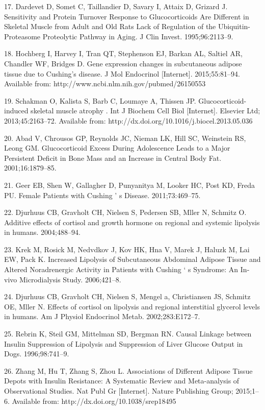 \documentclass[11pt]{article} %
\begin{document}
17. Dardevet D, Somet C, Taillandier D, Savary I, Attaix D, Grizard J.
Sensitivity and Protein Turnover Response to Glucocorticoids Are
Different in Skeletal Muscle from Adult and Old Rats Lack of Regulation
of the Ubiquitin-Proteasome Proteolytic Pathway in Aging. J Clin Invest.
1995;96:2113--9.

18. Hochberg I, Harvey I, Tran QT, Stephenson EJ, Barkan AL, Saltiel AR,
Chandler WF, Bridges D. Gene expression changes in subcutaneous adipose
tissue due to Cushing's disease. J Mol Endocrinol {[}Internet{]}.
2015;55:81--94. Available from:
http://www.ncbi.nlm.nih.gov/pubmed/26150553

19. Schakman O, Kalista S, Barb C, Loumaye A, Thissen JP.
Glucocorticoid-induced skeletal muscle atrophy . Int J Biochem Cell
Biol {[}Internet{]}. Elsevier Ltd; 2013;45:2163--72. Available from:
http://dx.doi.org/10.1016/j.biocel.2013.05.036

20. Abad V, Chrousos GP, Reynolds JC, Nieman LK, Hill SC, Weinstein RS,
Leong GM. Glucocorticoid Excess During Adolescence Leads to a Major
Persistent Deficit in Bone Mass and an Increase in Central Body Fat.
2001;16:1879--85.

21. Geer EB, Shen W, Gallagher D, Punyanitya M, Looker HC, Post KD,
Freda PU. Female Patients with Cushing ' s Disease. 2011;73:469--75.

22. Djurhuus CB, Gravholt CH, Nielsen S, Pedersen SB, Mller N, Schmitz
O. Additive effects of cortisol and growth hormone on regional and
systemic lipolysis in humans. 2004;488--94.

23. Krek M, Rosick M, Nedvdkov J, Kov HK, Hna V, Marek J, Haluzk
M, Lai EW, Pack K. Increased Lipolysis of Subcutaneous Abdominal
Adipose Tissue and Altered Noradrenergic Activity in Patients with
Cushing ` s Syndrome: An In-vivo Microdialysis Study. 2006;421--8.

24. Djurhuus CB, Gravholt CH, Nielsen S, Mengel a, Christiansen JS,
Schmitz OE, Mller N. Effects of cortisol on lipolysis and regional
interstitial glycerol levels in humans. Am J Physiol Endocrinol Metab.
2002;283:E172--7.

25. Rebrin K, Steil GM, Mittelman SD, Bergman RN. Causal Linkage between
Insulin Suppression of Lipolysis and Suppression of Liver Glucose Output
in Dogs. 1996;98:741--9.

26. Zhang M, Hu T, Zhang S, Zhou L. Associations of Different Adipose
Tissue Depots with Insulin Resistance: A Systematic Review and
Meta-analysis of Observational Studies. Nat Publ Gr {[}Internet{]}.
Nature Publishing Group; 2015;1--6. Available from:
http://dx.doi.org/10.1038/srep18495
\end{document}
